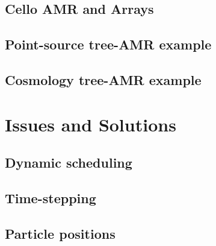 \documentclass{beamer}
\begin{document}





\subsection{Cello AMR and Arrays}





\subsection{Point-source tree-AMR example}


\subsection{Cosmology tree-AMR example}


\section{Issues and Solutions}
%
\subsection{Dynamic scheduling}

\subsection{Time-stepping}

\subsection{Particle positions}

\end{document}
